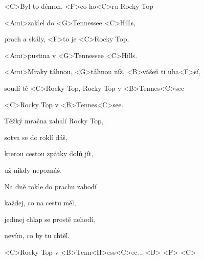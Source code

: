 

\zs
<C>Byl to démon, <F>co ho<C>ru Rocky Top

<Ami>zaklel do <G>Tennessee <C>Hills,

prach a skály, <F>to je <C>Rocky Top,

<Ami>pustina v <G>Tennessee <C>Hills.
\ks

\zr
<Ami>Mraky táhnou, <G>táhnou níž, <B>vášeň ti uha<F>sí,

soudí tě <C>Rocky Top, Rocky Top v <B>Tennes<C>see

<C>Rocky Top v <B>Tennes<C>see.
\kr

\zs
Těžký mračna zahalí Rocky Top,

sotva se do roklí dáš,

kterou cestou zpátky dolů jít,

už nikdy nepoznáš.
\ks

\zr \kr

\zs
Na dně rokle do prachu zahodí

každej, co na cestu měl,

jedinej chlap se prostě nehodí,

nevím, co by tu chtěl.
\ks

\zr
<C>Rocky Top v <B>Tenn<H>ess<C>ee... <B> 
<F> <C>
\kr


\kp
